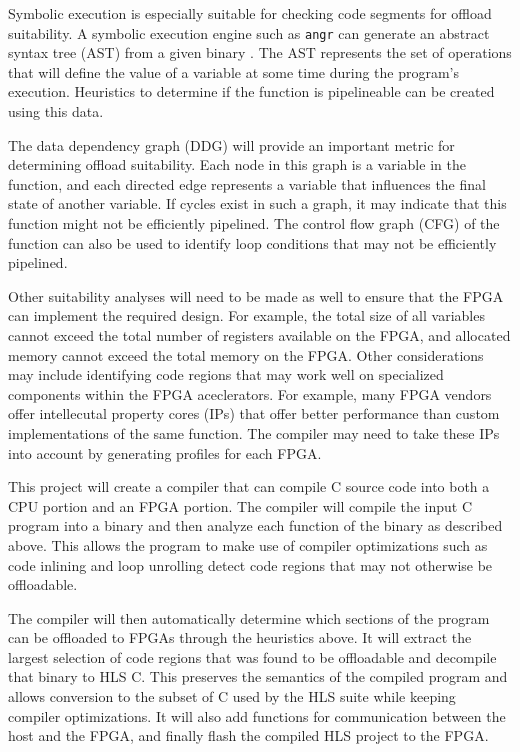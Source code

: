 \documentclass[11pt]{article}
\begin{document}
Symbolic execution is especially suitable for checking code segments for offload suitability.
A symbolic execution engine such as \texttt{angr} can generate an abstract syntax tree (AST) from a given binary \cite{wang2017angr}.
The AST represents the set of operations that will define the value of a variable at some time during the program’s execution.
Heuristics to determine if the function is pipelineable can be created using this data.

The data dependency graph (DDG) will provide an important metric for determining offload suitability.
Each node in this graph is a variable in the function, and each directed edge represents a variable that influences the final state of another variable.
If cycles exist in such a graph, it may indicate that this function might not be efficiently pipelined.
The control flow graph (CFG) of the function can also be used to identify loop conditions that may not be efficiently pipelined.

Other suitability analyses will need to be made as well to ensure that the FPGA can implement the required design.
For example, the total size of all variables cannot exceed the total number of registers available on the FPGA, and allocated memory cannot exceed the total memory on the FPGA.
Other considerations may include identifying code regions that may work well on specialized components within the FPGA aceclerators.
For example, many FPGA vendors offer intellecutal property cores (IPs) that offer better performance than custom implementations of the same function.
The compiler may need to take these IPs into account by generating profiles for each FPGA. 

This project will create a compiler that can compile C source code into both a CPU portion and an FPGA portion.
The compiler will compile the input C program into a binary and then analyze each function of the binary as described above.
This allows the program to make use of compiler optimizations such as code inlining and loop unrolling detect code regions that may not otherwise be offloadable.

The compiler will then automatically determine which sections of the program can be offloaded to FPGAs through the heuristics above.
It will extract the largest selection of code regions that was found to be offloadable and decompile that binary to HLS C.
This preserves the semantics of the compiled program and allows conversion to the subset of C used by the HLS suite while keeping compiler optimizations.
It will also add functions for communication between the host and the FPGA, and finally flash the compiled HLS project to the FPGA.
\end{document}
